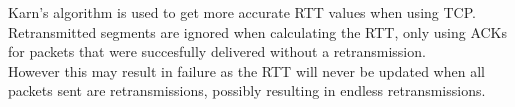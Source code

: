 Karn's algorithm is used to get more accurate RTT values when using TCP.
Retransmitted segments are ignored when calculating the RTT, only using ACKs for packets that were succesfully delivered without a retransmission.\\
However this may result in failure as the RTT will never be updated when all packets sent are retransmissions, possibly resulting in endless retransmissions.